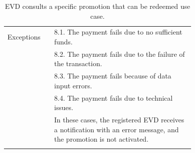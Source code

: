\begin{center}
\begin{longtable}{lp{0.75\linewidth}}
        \hline
        Exceptions       & 8.1. The payment fails due to no sufficient funds.                                                                    \\
        & 8.2. The payment fails due to the failure of the transaction.                                                         \\
        & 8.3. The payment fails because of data input errors.                                                                  \\
        & 8.4. The payment fails due to technical issues.                                                                       \\
        & In these cases, the registered EVD receives a notification with an error message, and the promotion is not activated. \\
        \hline
        \caption{EVD consults a specific promotion that can be redeemed use case.}
        \label{tab: EVD_consults_promotion_use_case}
    \end{longtable}
\end{center}

